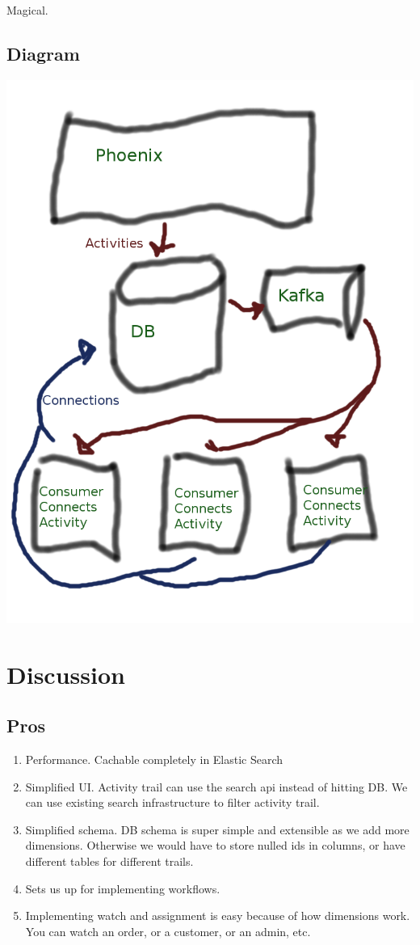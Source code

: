 \documentclass[11pt]{article}
\begin{document}
Magical.

\subsection{Diagram}
\includegraphics[scale=0.40]{implementation}
\newpage

\section{Discussion}
\subsection{Pros}
\begin{enumerate}
    \item Performance. Cachable completely in Elastic Search
    \item Simplified UI. Activity trail can use the search api instead of hitting DB.
        We can use existing search infrastructure to filter activity trail.
    \item Simplified schema. DB schema is super simple and extensible as we add more dimensions.
        Otherwise we would have to store nulled ids in columns, or have different tables for
        different trails. 
    \item Sets us up for implementing workflows.
    \item Implementing watch and assignment is easy because of how dimensions work. You can
        watch an order, or a customer, or an admin, etc.
\end{enumerate}
\end{document}
